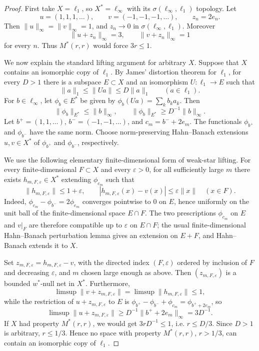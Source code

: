 \documentclass[11pt]{article}
\newcommand{\ellone}{\ell_1}
\newcommand{\ellinf}{\ell_\infty}
\newcommand{\weakstar}{w^*}
\begin{document}
\begin{proof}
First take \(X=\ellone\), so \(X^*=\ellinf\) with its \(\sigma(\ellinf,\ellone)\)
topology.  Let
\[
    u=(1,1,1,\ldots),\qquad v=(-1,-1,-1,\ldots),\qquad z_n=2e_n.
\]
Then \(\|u\|_\infty=\|v\|_\infty=1\), and \(z_n\to0\) in
\(\sigma(\ellinf,\ellone)\).  Moreover
\[
    \|u+z_n\|_\infty=3,\qquad \|v+z_n\|_\infty=1
\]
for every \(n\).  Thus \(M^*(r,r)\) would force \(3r\leq1\).

We now explain the standard lifting argument for arbitrary \(X\).  Suppose that
\(X\) contains an isomorphic copy of \(\ellone\).  By James' distortion theorem
for \(\ellone\), for every \(D>1\) there is a subspace \(E\subset X\) and an
isomorphism \(U:\ellone\to E\) such that
\[
    \|a\|_1\leq \|Ua\|\leq D\|a\|_1\qquad (a\in\ellone).
\]
For \(b\in\ellinf\), let \(\phi_b\in E^*\) be given by
\(\phi_b(Ua)=\sum_k b_k a_k\).  Then
\[
    \|\phi_b\|_{E^*}\leq \|b\|_\infty,\qquad
    \|\phi_b\|_{E^*}\geq D^{-1}\|b\|_\infty.
\]
Let \(b^+=(1,1,\ldots)\), \(b^-=(-1,-1,\ldots)\), and
\(c_m=b^-+2e_m\).  The functionals \(\phi_{b^+}\) and \(\phi_{b^-}\) have the
same norm.  Choose norm-preserving Hahn--Banach extensions \(u,v\in X^*\) of
\(\phi_{b^+}\) and \(\phi_{b^-}\), respectively.

We use the following elementary finite-dimensional form of weak-star lifting.
For every finite-dimensional \(F\subset X\) and every \(\varepsilon>0\), for all
sufficiently large \(m\) there exists \(h_{m,F,\varepsilon}\in X^*\) extending
\(\phi_{c_m}\) such that
\[
    \|h_{m,F,\varepsilon}\|\leq 1+\varepsilon,\qquad
    |h_{m,F,\varepsilon}(x)-v(x)|\leq \varepsilon\|x\|
    \quad(x\in F).
\]
Indeed, \(\phi_{c_m}-\phi_{b^-}=2\phi_{e_m}\) converges pointwise to \(0\) on
\(E\), hence uniformly on the unit ball of the finite-dimensional space
\(E\cap F\).  The two prescriptions \(\phi_{c_m}\) on \(E\) and \(v|_F\) are
therefore compatible up to \(\varepsilon\) on \(E\cap F\); the usual
finite-dimensional Hahn--Banach perturbation lemma gives an extension on
\(E+F\), and Hahn--Banach extends it to \(X\).

Set \(z_{m,F,\varepsilon}=h_{m,F,\varepsilon}-v\), with the directed index
\((F,\varepsilon)\) ordered by inclusion of \(F\) and decreasing
\(\varepsilon\), and \(m\) chosen large enough as above.  Then
\((z_{m,F,\varepsilon})\) is a bounded \(\weakstar\)-null net in \(X^*\).
Furthermore,
\[
    \limsup \|v+z_{m,F,\varepsilon}\|
    =
    \limsup \|h_{m,F,\varepsilon}\|
    \leq 1,
\]
while the restriction of \(u+z_{m,F,\varepsilon}\) to \(E\) is
\(\phi_{b^+}-\phi_{b^-}+\phi_{c_m}=\phi_{b^+ + 2e_m}\), so
\[
    \limsup \|u+z_{m,F,\varepsilon}\|
    \geq
    D^{-1}\|b^+ + 2e_m\|_\infty
    =
    3D^{-1}.
\]
If \(X\) had property \(M^*(r,r)\), we would get \(3rD^{-1}\leq1\), i.e.
\(r\leq D/3\).  Since \(D>1\) is arbitrary, \(r\leq1/3\).  Hence no space with
property \(M^*(r,r)\), \(r>1/3\), can contain an isomorphic copy of \(\ellone\).
\end{proof}
\end{document}
